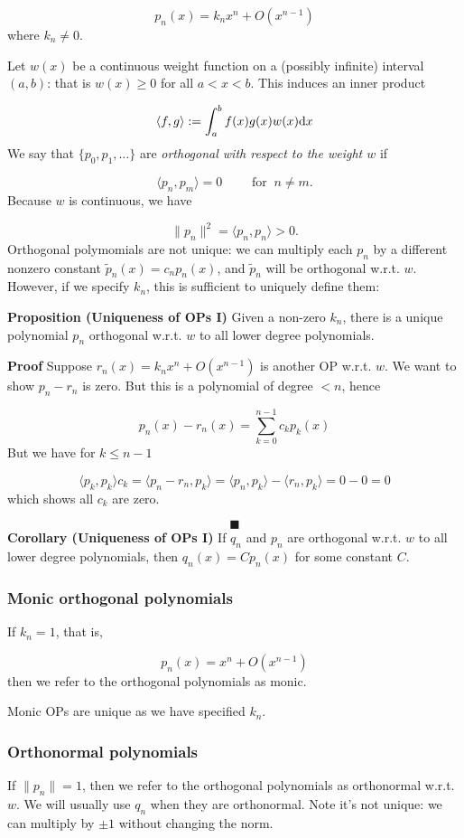 \documentclass[12pt,a4paper]{article}
\begin{document}
\[
p_n(x) = k_n x^n + O(x^{n-1})
\]
where $k_n \neq 0$.

Let $w(x)$ be a continuous weight function on a (possibly infinite) interval $(a,b)$: that is $w(x) \geq 0$ for all $a < x < b$. This induces an inner product

\[
\langle f,g \rangle := \int_a^b f(x) g(x) w(x) {\rm d}x
\]
We say that $\{p_0, p_1,\ldots\}$ are \emph{orthogonal with respect to the weight $w$} if

\[
\langle p_n,p_m \rangle = 0\qquad \text{ for }\: n \neq m.
\]
Because $w$ is continuous, we have

\[
\| p_n \|^2 = \langle p_n,p_n \rangle > 0 .
\]
Orthogonal polymomials are not unique: we can multiply each $p_n$ by a different nonzero constant $\tilde p_n(x) = c_n p_n(x)$, and $\tilde p_n$ will be orthogonal w.r.t. $w$.  However, if we specify $k_n$, this is sufficient to uniquely define them:

\textbf{Proposition (Uniqueness of OPs I)} Given a non-zero $k_n$, there is a unique polynomial $p_n$ orthogonal w.r.t. $w$ to all lower degree polynomials.

\textbf{Proof} Suppose $r_n(x) = k_n x^n + O(x^{n-1})$ is another  OP w.r.t. $w$. We want to show $p_n - r_n$ is zero. But this is a polynomial of degree $<n$, hence

\[
p_n(x) - r_n(x) = \sum_{k=0}^{n-1} c_k p_k(x)
\]
But we have for $k \leq n-1$

\[
\langle p_k,p_k \rangle c_k = \langle p_n - r_n, p_k \rangle = \langle p_n,p_k \rangle - \langle r_n, p_k\rangle = 0 - 0 = 0
\]
which shows all $c_k$ are zero.

\[
\blacksquare
\]
\textbf{Corollary (Uniqueness of OPs I)} If $q_n$ and $p_n$ are orthogonal w.r.t. $w$ to all lower degree polynomials, then $q_n(x) = C p_n(x)$ for some constant $C$.

\subsubsection{Monic orthogonal polynomials}
If $k_n = 1$, that is,

\[
p_n(x) = x^n + O(x^{n-1})
\]
then we refer to the orthogonal polynomials as monic.

Monic OPs are unique as we have specified $k_n$.

\subsubsection{Orthonormal polynomials}
If  $\| p_n \| = 1$, then we refer to the orthogonal polynomials as orthonormal w.r.t. $w$. We will usually use $q_n$ when they are orthonormal.   Note it's not unique: we can multiply by $\pm 1$ without changing the norm.
\end{document}
